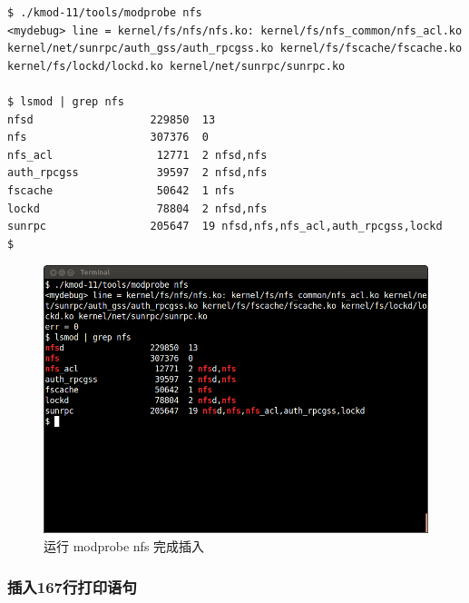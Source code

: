 \documentclass[11pt,a4paper]{article}
\makeatletter
\def\maxwidth{\ifdim\Gin@nat@width>\linewidth\linewidth
\else\Gin@nat@width\fi}
\let\Oldincludegraphics\includegraphics
\renewcommand{\includegraphics}[1]{\Oldincludegraphics[width=\maxwidth]{#1}}
\makeatother
\begin{document}
{\begin{shaded}\begin{verbatim}
$ ./kmod-11/tools/modprobe nfs
<mydebug> line = kernel/fs/nfs/nfs.ko: kernel/fs/nfs_common/nfs_acl.ko kernel/net/sunrpc/auth_gss/auth_rpcgss.ko kernel/fs/fscache/fscache.ko kernel/fs/lockd/lockd.ko kernel/net/sunrpc/sunrpc.ko

$ lsmod | grep nfs
nfsd                  229850  13 
nfs                   307376  0 
nfs_acl                12771  2 nfsd,nfs
auth_rpcgss            39597  2 nfsd,nfs
fscache                50642  1 nfs
lockd                  78804  2 nfsd,nfs
sunrpc                205647  19 nfsd,nfs,nfs_acl,auth_rpcgss,lockd
$ 
\end{verbatim}\end{shaded}}
\begin{figure}[htbp]
\centering
\includegraphics{./pictures/3-3-modprobe.png}
\caption{运行 modprobe nfs 完成插入}
\end{figure}

\subsubsection{插入167行打印语句}
\end{document}
